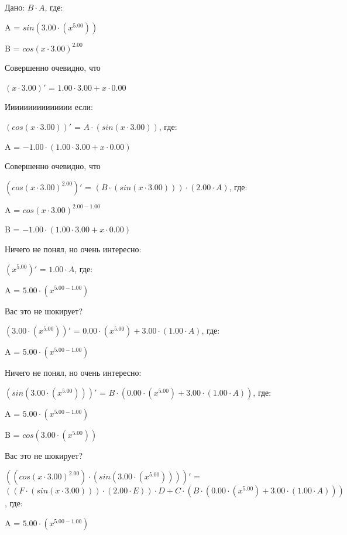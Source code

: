 \documentclass{article}
\begin{document}
Дано: $B \cdot A$, где:

\bigskip\qquad A = $sin(3.00 \cdot ({x}^{5.00}))$

\qquad B = ${cos(x \cdot 3.00)}^{2.00}$

\bigskip Совершенно очевидно, что

$(x \cdot 3.00)'$ = $1.00 \cdot 3.00 + x \cdot 0.00$

\bigskip Иииииииииииииии если:

$(cos(x \cdot 3.00))'$ = $A \cdot (sin(x \cdot 3.00))$, где:

\bigskip\qquad A = $-1.00 \cdot (1.00 \cdot 3.00 + x \cdot 0.00)$



\bigskip Совершенно очевидно, что

$({cos(x \cdot 3.00)}^{2.00})'$ = $(B \cdot (sin(x \cdot 3.00))) \cdot (2.00 \cdot A)$, где:

\bigskip\qquad A = ${cos(x \cdot 3.00)}^{2.00 - 1.00}$

\qquad B = $-1.00 \cdot (1.00 \cdot 3.00 + x \cdot 0.00)$



\bigskip Ничего не понял, но очень интересно:

$({x}^{5.00})'$ = $1.00 \cdot A$, где:

\bigskip\qquad A = $5.00 \cdot ({x}^{5.00 - 1.00})$



\bigskip Вас это не шокирует?

$(3.00 \cdot ({x}^{5.00}))'$ = $0.00 \cdot ({x}^{5.00}) + 3.00 \cdot (1.00 \cdot A)$, где:

\bigskip\qquad A = $5.00 \cdot ({x}^{5.00 - 1.00})$



\bigskip Ничего не понял, но очень интересно:

$(sin(3.00 \cdot ({x}^{5.00})))'$ = $B \cdot (0.00 \cdot ({x}^{5.00}) + 3.00 \cdot (1.00 \cdot A))$, где:

\bigskip\qquad A = $5.00 \cdot ({x}^{5.00 - 1.00})$

\qquad B = $cos(3.00 \cdot ({x}^{5.00}))$



\bigskip Вас это не шокирует?

$(({cos(x \cdot 3.00)}^{2.00}) \cdot (sin(3.00 \cdot ({x}^{5.00}))))'$ = $((F \cdot (sin(x \cdot 3.00))) \cdot (2.00 \cdot E)) \cdot D + C \cdot (B \cdot (0.00 \cdot ({x}^{5.00}) + 3.00 \cdot (1.00 \cdot A)))$, где:

\bigskip\qquad A = $5.00 \cdot ({x}^{5.00 - 1.00})$
\end{document}
